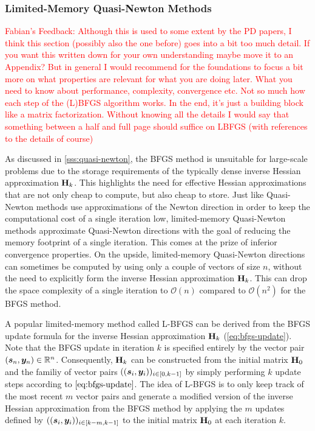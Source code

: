 \subsubsection{Limited-Memory Quasi-Newton Methods}\label{sss:limited-memory-quasi-newton}
\textcolor{red}{Fabian's Feedback: Although this is used to some extent by the PD papers, I think this section (possibly also the one before) 
goes into a bit too much detail. If you want this written down for your own understanding maybe move it to an Appendix? But in general I 
would recommend for the foundations to focus a bit more on what properties are relevant for what you are doing later.  What you need to 
know about performance, complexity, convergence etc. Not so much how each step of the (L)BFGS algorithm works. In the end, it's just a 
building block like a matrix factorization. Without knowing all the details I would say that something between a half and full page should 
suffice on LBFGS (with references to 
the details of course)}

As discussed in \cref{sss:quasi-newton}, the BFGS method is unsuitable for large-scale problems due to the storage requirements of the 
typically dense inverse Hessian approximation $\mathbf{H}_k$. This highlights the need for effective Hessian approximations that are not only
cheap to compute, but also cheap to store. Just like Quasi-Newton methods use approximations of the Newton direction in order to keep 
the computational cost of a single iteration low, limited-memory Quasi-Newton methods approximate Quasi-Newton directions with 
the goal of reducing the memory footprint of a single iteration. This comes at the prize of inferior convergence properties. On the upside,
limited-memory Quasi-Newton directions can sometimes be computed by using only a couple of vectors of size $n$, without the need to 
explicitly form the inverse Hessian approximation $\mathbf{H}_k$. This can drop the space complexity of a single iteration to $\mathcal{O}(n)$ 
compared to $\mathcal{O}(n^2)$ for the BFGS method.

A popular limited-memory method called L-BFGS can be derived from the BFGS update formula for the inverse Hessian approximation 
$\mathbf{H}_k$ (\cref{eq:bfgs-update}). Note that the BFGS update in iteration $k$ is specified entirely 
by the vector 
pair $(\bm{s}_n, \bm{y}_n) \in \mathbb{R}^n$. Consequently, $\mathbf{H}_k$ can be constructed from the initial matrix $\mathbf{H}_0$ and the familiy 
of vector pairs $((\bm{s}_i, \bm{y}_i))_{i \in [0, k-1]}$ by simply performing $k$ update steps according to $\autoref{eq:bfgs-update}$.
The idea of L-BFGS is to only keep track of the most recent $m$ vector pairs and generate a modified version of the inverse Hessian 
approximation from the BFGS method by applying the $m$ updates defined by $((\bm{s}_i, \bm{y}_i))_{i \in [k-m, k-1]}$ to the 
initial matrix $\mathbf{H}_0$ at each iteration $k$.

